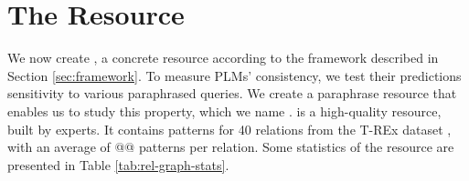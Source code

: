 \section{The \resource{} Resource}
\label{sec:rel-graph}

We now create \resource{}, a concrete resource according to the framework described in Section \ref{sec:framework}.
To measure PLMs' consistency, we test their predictions sensitivity to various paraphrased queries. We create a paraphrase resource that enables us to study this property, which we name \resource{}.  \resource{} is a high-quality resource, built by experts. %
It contains patterns for 40 relations from the T-REx dataset \cite{T-REx}, with an average of @@ patterns per relation.
Some statistics of the resource are presented in Table \ref{tab:rel-graph-stats}.








